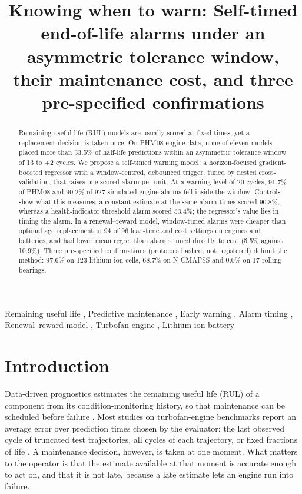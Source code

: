 \documentclass[a4paper,fleqn,doubleblind]{cas-dc}
\begin{document}
\let\WriteBookmarks\relax
\let\printorcid\relax
\def\floatpagepagefraction{1}
\def\textpagefraction{.001}
\title [mode = title]{Knowing when to warn: Self-timed end-of-life alarms under an asymmetric tolerance window, their maintenance cost, and three pre-specified confirmations}
\begin{abstract}
Remaining useful life (RUL) models are usually scored at fixed times, yet a replacement decision is taken once. On PHM08 engine data, none of eleven models placed more than 33.5\% of half-life predictions within an asymmetric tolerance window of \textminus{}13 to +2 cycles. We propose a self-timed warning model: a horizon-focused gradient-boosted regressor with a window-centred, debounced trigger, tuned by nested cross-validation, that raises one scored alarm per unit. At a warning level of 20 cycles, 91.7\% of PHM08 and 90.2\% of 927 simulated engine alarms fell inside the window. Controls show what this measures: a constant estimate at the same alarm times scored 90.8\%, whereas a health-indicator threshold alarm scored 53.4\%; the regressor's value lies in timing the alarm. In a renewal--reward model, window-tuned alarms were cheaper than optimal age replacement in 94 of 96 lead-time and cost settings on engines and batteries, and had lower mean regret than alarms tuned directly to cost (5.5\% against 10.9\%). Three pre-specified confirmations (protocols hashed, not registered) delimit the method: 97.6\% on 123 lithium-ion cells, 68.7\% on N-CMAPSS and 0.0\% on 17 rolling bearings.
\end{abstract}
\begin{keywords}
Remaining useful life \sep
Predictive maintenance \sep
Early warning \sep
Alarm timing \sep
Renewal--reward model \sep
Turbofan engine \sep
Lithium-ion battery
\end{keywords}
\maketitle
\linenumbers
\section{Introduction}\label{sec:1}

Data-driven prognostics estimates the remaining useful life (RUL) of a component from its condition-monitoring history, so that maintenance can be scheduled before failure \cite{lei2018,si2011}. Most studies on turbofan-engine benchmarks report an average error over prediction times chosen by the evaluator: the last observed cycle of truncated test trajectories, all cycles of each trajectory, or fixed fractions of life \cite{ramasso2014}. A maintenance decision, however, is taken at one moment. What matters to the operator is that the estimate available at that moment is accurate enough to act on, and that it is not late, because a late estimate lets an engine run into failure.
\end{document}
